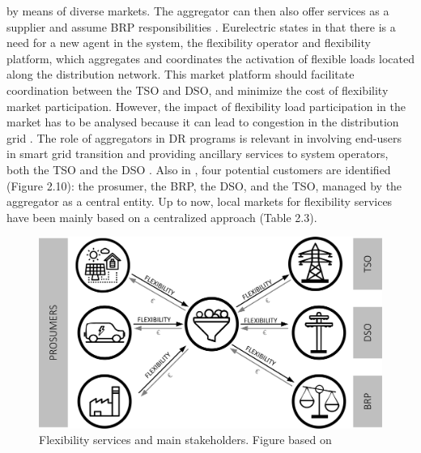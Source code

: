 by means of diverse markets. The aggregator can then also offer services as a supplier and assume BRP responsibilities \cite{MarketDesignENTSOE}. Eurelectric states in \cite{mandatova2014flexibility} that there is a need for a new agent in the system, the flexibility operator and flexibility platform, which aggregates and coordinates the activation of flexible loads located along the distribution network. This market platform should facilitate coordination between the TSO and DSO, and minimize the cost of flexibility market participation. However, the impact of flexibility load participation in the market has to be analysed because it can lead to congestion in the distribution grid \cite{esterl2016impact}. The role of aggregators in DR programs is relevant in involving end-users in smart grid transition and providing ancillary services to system operators, both the TSO and the DSO \cite{Carreiro2017}.
Also in \cite{USEFFoundation2015a}, four potential customers are identified (Figure 2.10): the prosumer, the BRP, the DSO, and the TSO, managed by the aggregator as a central entity. Up to now, local markets for flexibility services have been mainly based on a centralized approach (Table 2.3).

\begin{figure}[]
	\centering
	\includegraphics[width=0.4\columnwidth ]{ChapterIntro/Figures/Figure2.10.jpg}
		\caption{Flexibility services and main stakeholders. Figure based on \cite{USEFFoundation2015a} }  
\label{figure210}
\end{figure}

